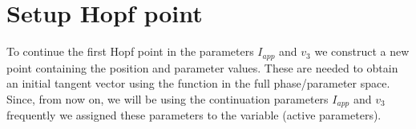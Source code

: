 \documentclass[letterpaper,10pt,english]{jupyterBook}
\begin{document}
\noindent{}


\section{Setup Hopf point}
\label{\detokenize{Morris-Lecar:setup-hopf-point}}
\sphinxAtStartPar
To continue the first Hopf point in the parameters \(I_{app}\) and \(v_3\) we
construct a new point  containing the position and parameter values.
These are needed to obtain an initial tangent vector \sphinxhyphen{} using the function
 \sphinxhyphen{} in the full phase/parameter space. Since, from now on, we will be
using the continuation parameters \(I_{app}\) and \(v_3\) frequently we assigned
these parameters to the variable  (active parameters).

\begin{sphinxVerbatim}[commandchars=\\\{\}]
\PYG{p}{[}\PYG{p}{]}
\PYG{p}{[}\PYG{p}{]}
\end{sphinxVerbatim}
\end{document}
